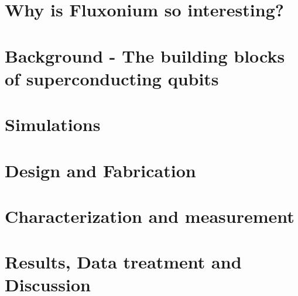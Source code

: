 \documentclass[paper = a4, 12pt, oneside]{scrbook}
\begin{document}
    
        
        
        \setcounter{tocdepth}{2} %
        \setcounter{secnumdepth}{2} %
        \tableofcontents 
        \listoffigures
        \listoftables
        \printglossary[type=\acronymtype]
        \part{Why is Fluxonium so interesting?}\label{part:I}
            
            
        \part{Background - The building blocks of superconducting qubits}\label{part:II}
            
            
            
            
            
            
        \part{Simulations}\label{part:III}
            
        \part{Design and Fabrication}\label{part:IV} %
            
            
        \part{Characterization and measurement}\label{part:V}
            
            
        \part{Results, Data treatment and Discussion}\label{part:VI}
            
            
\end{document}
